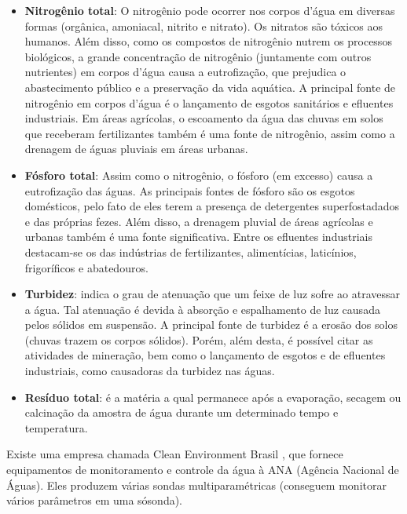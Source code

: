 \begin{itemize}
 \item \textbf{Nitrogênio total}: O nitrogênio pode ocorrer nos corpos d’água em diversas formas (orgânica, amoniacal, nitrito 
    e nitrato). Os nitratos são tóxicos aos humanos.
    Além disso, como os compostos de nitrogênio nutrem os processos biológicos, a grande concentração de nitrogênio 
    (juntamente com outros nutrientes) em corpos d’água causa a eutrofização, que prejudica o abastecimento público e
    a preservação da vida aquática.
    A principal fonte de nitrogênio em corpos d’água é o lançamento de esgotos sanitários e efluentes industriais.
    Em áreas agrícolas, o escoamento da água das chuvas em solos que receberam fertilizantes também é uma fonte de nitrogênio,
    assim como a drenagem de águas pluviais em áreas urbanas.
    
 \item \textbf{Fósforo total}: Assim como o nitrogênio, o fósforo (em excesso) causa a eutrofização das águas.
    As principais fontes de fósforo são os esgotos domésticos, pelo fato de eles terem a presença de detergentes
    superfostadados e das próprias fezes. Além disso, a drenagem pluvial de áreas agrícolas e urbanas também é uma fonte 
    significativa. Entre os efluentes industriais destacam-se os das indústrias de fertilizantes, alimentícias, laticínios, 
    frigoríficos e abatedouros.
    
 \item \textbf{Turbidez}: indica o grau de atenuação que um feixe de luz sofre ao atravessar a água. Tal atenuação é devida à
    absorção e espalhamento de luz causada pelos sólidos em suspensão. 
    A principal fonte de turbidez é a erosão dos solos (chuvas trazem os corpos sólidos).
    Porém, além desta, é possível citar as atividades de mineração, bem como o lançamento de esgotos e de efluentes industriais,
    como causadoras da turbidez nas águas.
    
 \item \textbf{Resíduo total}: é a matéria a qual permanece após a evaporação, secagem ou calcinação da amostra de água durante um 
    determinado tempo e temperatura.    
\end{itemize}

Existe uma empresa chamada Clean Environment Brasil \cite{cleanEnvironmentBrasil}, que fornece equipamentos de monitoramento e controle da água à ANA 
(Agência Nacional de Águas). Eles produzem várias sondas multiparamétricas (conseguem monitorar vários parâmetros em uma sósonda).

